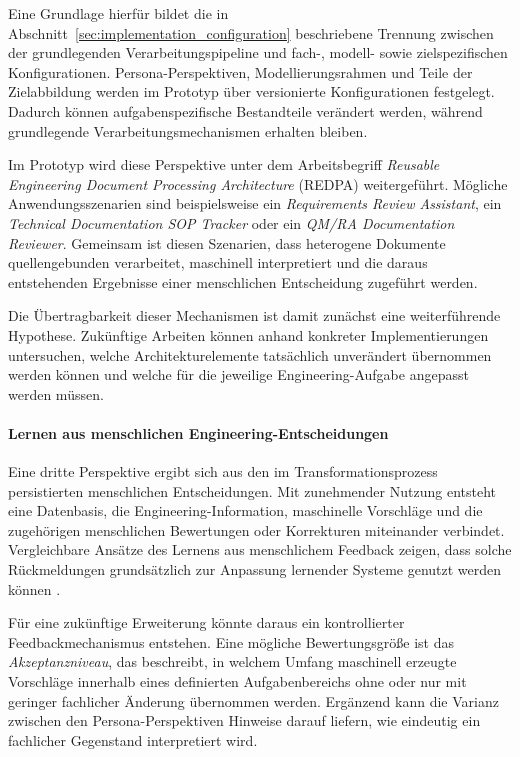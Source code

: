 Eine Grundlage hierfür bildet die in
Abschnitt~\ref{sec:implementation_configuration} beschriebene Trennung
zwischen der grundlegenden Verarbeitungspipeline und fach-, modell- sowie
zielspezifischen Konfigurationen. Persona-Perspektiven,
Modellierungsrahmen und Teile der Zielabbildung werden im Prototyp über
versionierte Konfigurationen festgelegt. Dadurch können aufgabenspezifische
Bestandteile verändert werden, während grundlegende
Verarbeitungsmechanismen erhalten bleiben.

Im Prototyp wird diese Perspektive unter dem Arbeitsbegriff
\emph{Reusable Engineering Document Processing Architecture} (REDPA)
weitergeführt. Mögliche Anwendungsszenarien sind beispielsweise ein
\emph{Requirements Review Assistant}, ein
\emph{Technical Documentation SOP Tracker} oder ein
\emph{QM/RA Documentation Reviewer}. Gemeinsam ist diesen Szenarien, dass
heterogene Dokumente quellengebunden verarbeitet, maschinell interpretiert
und die daraus entstehenden Ergebnisse einer menschlichen Entscheidung
zugeführt werden.

Die Übertragbarkeit dieser Mechanismen ist damit zunächst eine
weiterführende Hypothese. Zukünftige Arbeiten können anhand konkreter
Implementierungen untersuchen, welche Architekturelemente tatsächlich
unverändert übernommen werden können und welche für die jeweilige
Engineering-Aufgabe angepasst werden müssen.

\paragraph{Lernen aus menschlichen Engineering-Entscheidungen}

Eine dritte Perspektive ergibt sich aus den im Transformationsprozess
persistierten menschlichen Entscheidungen. Mit zunehmender Nutzung entsteht
eine Datenbasis, die Engineering-Information, maschinelle Vorschläge und die
zugehörigen menschlichen Bewertungen oder Korrekturen miteinander verbindet.
Vergleichbare Ansätze des Lernens aus menschlichem Feedback zeigen, dass
solche Rückmeldungen grundsätzlich zur Anpassung lernender Systeme genutzt
werden können \cite{Christiano2017,Ouyang2022}.

Für eine zukünftige Erweiterung könnte daraus ein kontrollierter
Feedbackmechanismus entstehen. Eine mögliche Bewertungsgröße ist das
\emph{Akzeptanzniveau}, das beschreibt, in welchem Umfang maschinell erzeugte
Vorschläge innerhalb eines definierten Aufgabenbereichs ohne oder nur mit
geringer fachlicher Änderung übernommen werden. Ergänzend kann die Varianz
zwischen den Persona-Perspektiven Hinweise darauf liefern, wie eindeutig ein
fachlicher Gegenstand interpretiert wird.


